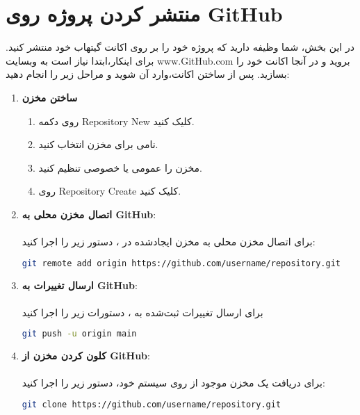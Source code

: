 \section*{منتشر کردن پروژه روی GitHub}
در این بخش، شما وظیفه دارید که پروژه خود را بر روی اکانت گیتهاب خود منتشر کنید. برای اینکار،ابتدا نیاز است به وبسایت www.GitHub.com بروید و در آنجا اکانت خود را بسازید. پس از ساختن اکانت،وارد آن شوید و مراحل زیر را انجام دهید:

\begin{enumerate}
    \item \textbf{ساختن مخزن}
    \begin{enumerate}
        \item {روی دکمه Repository New کلیک کنید.}
        \item {نامی برای مخزن انتخاب کنید.}
        \item {مخزن را عمومی یا خصوصی تنظیم کنید.}
        \item {روی Repository Create  کلیک کنید.}
    \end{enumerate}
    \item \textbf{اتصال مخزن محلی به GitHub}:\\\\
    برای اتصال مخزن  محلی به مخزن ایجادشده در ، دستور زیر را اجرا کنید:
    
    \begin{terminal}
    \begin{lstlisting}[language=bash]
    git remote add origin https://github.com/username/repository.git
    \end{lstlisting}
    \end{terminal}

    \item \textbf{ارسال تغییرات به GitHub}:\\\\
    برای ارسال تغییرات ثبت‌شده به ، دستورات زیر را اجرا کنید
    \begin{terminal}
    \begin{lstlisting}[language=bash]
    git push -u origin main
    \end{lstlisting}
    \end{terminal}  
    
    \item \textbf{کلون کردن مخزن از GitHub}:\\\\
    برای دریافت یک مخزن موجود از  روی سیستم خود، دستور زیر را اجرا کنید:
    \begin{terminal}
    \begin{lstlisting}[language=bash]
    git clone https://github.com/username/repository.git
    \end{lstlisting}
    \end{terminal} 


\end{enumerate}

